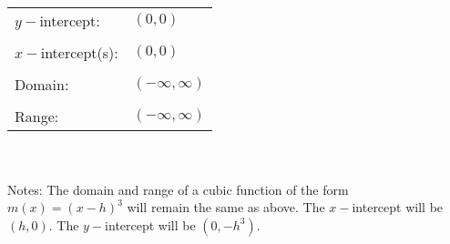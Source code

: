 \documentclass[12pt]{book}
\theoremstyle{definition}
\begin{document}
\ \par
\begin{tabular}{ll}
$y-$intercept: & $(0,0)$\\
&\\
$x-$intercept(s): & $(0,0)$\\
&\\
Domain: & $(-\infty,\infty)$ \\
&\\
Range: & $(-\infty,\infty)$
\end{tabular}
\\
~\\

Notes: The domain and range of a cubic function of the form $m(x)=(x-h)^3$ will remain the same as above.  The $x-$intercept will be $(h,0)$.  The $y-$intercept will be $(0,-h^3)$. 

\newpage
\end{document}
